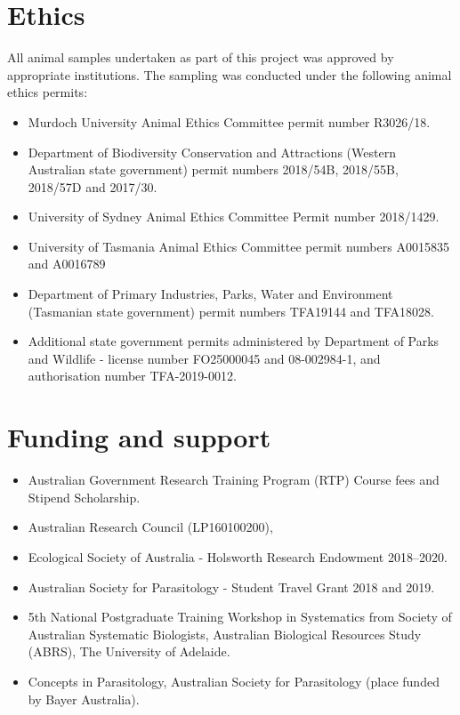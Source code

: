 \documentclass[a4paper, nobind]{templates/ociamthesis}
\providecommand{\tightlist}{%
  \setlength{\itemsep}{0pt}\setlength{\parskip}{0pt}}
\begin{document}
\hypertarget{ethics}{%
\section*{Ethics}\label{ethics}}

All animal samples undertaken as part of this project was approved by appropriate institutions. The sampling was conducted under the following animal ethics permits:

\begin{itemize}
\tightlist
\item
  Murdoch University Animal Ethics Committee permit number R3026/18.
\item
  Department of Biodiversity Conservation and Attractions (Western Australian state government) permit numbers 2018/54B, 2018/55B, 2018/57D and 2017/30.
\item
  University of Sydney Animal Ethics Committee Permit number 2018/1429.
\item
  University of Tasmania Animal Ethics Committee permit numbers A0015835 and A0016789
\item
  Department of Primary Industries, Parks, Water and Environment (Tasmanian state government) permit numbers TFA19144 and TFA18028.
\item
  Additional state government permits administered by Department of Parks and Wildlife - license number FO25000045 and 08-002984-1, and authorisation number TFA-2019-0012.
\end{itemize}

\hypertarget{funding-and-support}{%
\section*{Funding and support}\label{funding-and-support}}

\begin{itemize}
\tightlist
\item
  Australian Government Research Training Program (RTP) Course fees and Stipend Scholarship.
\item
  Australian Research Council (LP160100200),
\item
  Ecological Society of Australia - Holsworth Research Endowment 2018--2020.
\item
  Australian Society for Parasitology - Student Travel Grant 2018 and 2019.
\item
  5th National Postgraduate Training Workshop in Systematics from Society of Australian Systematic Biologists, Australian Biological Resources Study (ABRS), The University of Adelaide.
\item
  Concepts in Parasitology, Australian Society for Parasitology (place funded by Bayer Australia).
\end{itemize}
\end{document}
